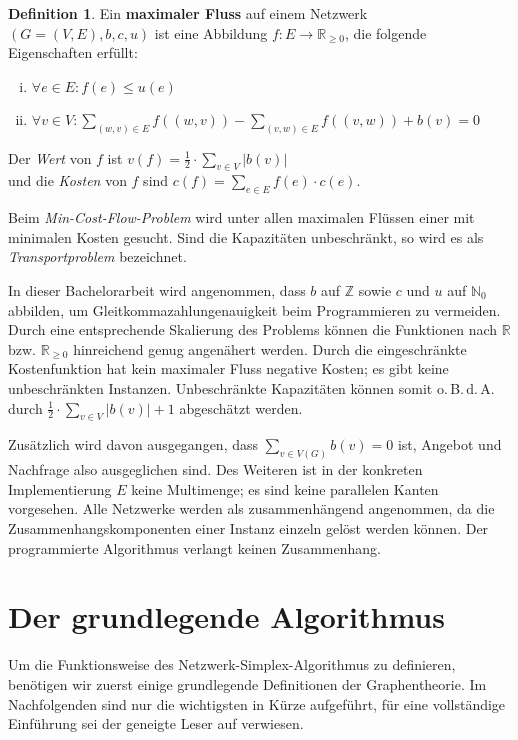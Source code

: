 \documentclass[a4paper,twoside,ngerman]{report}
\theoremstyle{plain}
\theoremstyle{definition}
\newtheorem{defn}[thm]{Definition}
\newcommand{\obda}{o.\,B.\,d.\,A. }
\begin{document}
\begin{defn}\label{DefMaxFlow}Ein \textbf{maximaler Fluss} auf einem Netzwerk $(G=(V,E),b,c,u)$ ist eine Abbildung $f : E\rightarrow\mathbb{R}_{\geq 0}$, die folgende Eigenschaften erfüllt:
\begin{enumerate}[(i)]
\item $\forall e\in E : f(e)\leq u(e) $
\item $\forall v\in V : \sum_{(w,v)\in E} f((w,v)) - \sum_{(v,w)\in E} f((v,w)) + b(v) = 0$\label{DefMaxFlowII}
\end{enumerate}
Der \emph{Wert} von $f$ ist
$v(f) = \frac{1}{2}\cdot\sum_{v\in V} |b(v)|$\\
und die \emph{Kosten} von $f$ sind
$c(f) = \sum_{e\in E} f(e)\cdot c(e)$.
\end{defn}

Beim \emph{Min-Cost-Flow-Problem} wird unter allen maximalen Flüssen einer mit minimalen Kosten gesucht. Sind die Kapazitäten unbeschränkt, so wird es als \emph{Transportproblem} bezeichnet.

In dieser Bachelorarbeit wird angenommen, dass $b$ auf $\mathbb{Z}$ sowie $c$ und $u$ auf $\mathbb{N}_0$ abbilden, um Gleitkommazahlungenauigkeit beim Programmieren zu vermeiden. Durch eine entsprechende Skalierung des Problems können die Funktionen nach $\mathbb{R}$ bzw. $\mathbb{R}_{\geq 0}$ hinreichend genug angenähert werden. Durch die eingeschränkte Kostenfunktion hat kein maximaler Fluss negative Kosten; es gibt keine unbeschränkten Instanzen. Unbeschränkte Kapazitäten können somit \obda durch $\frac{1}{2}\cdot\sum_{v\in V} |b(v)| + 1$ abgeschätzt werden.

Zusätzlich wird davon ausgegangen, dass $\sum_{v\in V(G)} b(v) = 0$ ist, Angebot und Nachfrage also ausgeglichen sind. Des Weiteren ist in der konkreten Implementierung $E$ keine Multimenge; es sind keine parallelen Kanten vorgesehen. Alle Netzwerke werden als zusammenhängend angenommen, da die Zusammenhangskomponenten einer Instanz einzeln gelöst werden können. Der programmierte Algorithmus verlangt keinen Zusammenhang.

\section{Der grundlegende Algorithmus}\label{ch:alg}
Um die Funktionsweise des Netzwerk-Simplex-Algorithmus zu definieren, benötigen wir zuerst einige grundlegende Definitionen der Graphentheorie. Im Nachfolgenden sind nur die wichtigsten in Kürze aufgeführt, für eine vollständige Einführung sei der geneigte Leser auf \cite{Alma} verwiesen.
\end{document}
